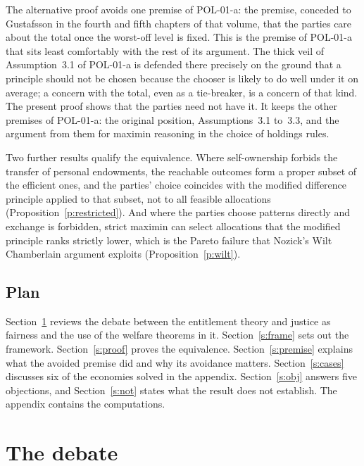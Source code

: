 \documentclass{situationist-preprint}
\begin{document}
The alternative proof avoids one premise of POL-01-a: the premise, conceded to Gustafsson in the fourth and fifth chapters of that volume, that the parties care about the total once the worst-off level is fixed. This is the premise of POL-01-a that sits least comfortably with the rest of its argument. The thick veil of Assumption~3.1 of POL-01-a is defended there precisely on the ground that a principle should not be chosen because the chooser is likely to do well under it on average; a concern with the total, even as a tie-breaker, is a concern of that kind. The present proof shows that the parties need not have it. It keeps the other premises of POL-01-a: the original position, Assumptions~3.1 to~3.3, and the argument from them for maximin reasoning in the choice of holdings rules.

Two further results qualify the equivalence. Where self-ownership forbids the transfer of personal endowments, the reachable outcomes form a proper subset of the efficient ones, and the parties' choice coincides with the modified difference principle applied to that subset, not to all feasible allocations (Proposition~\ref{p:restricted}). And where the parties choose patterns directly and exchange is forbidden, strict maximin can select allocations that the modified principle ranks strictly lower, which is the Pareto failure that Nozick's Wilt Chamberlain argument exploits (Proposition~\ref{p:wilt}).

\subsection{Plan}

Section~\ref{s:lit} reviews the debate between the entitlement theory and justice as fairness and the use of the welfare theorems in it. Section~\ref{s:frame} sets out the framework. Section~\ref{s:proof} proves the equivalence. Section~\ref{s:premise} explains what the avoided premise did and why its avoidance matters. Section~\ref{s:cases} discusses six of the economies solved in the appendix. Section~\ref{s:obj} answers five objections, and Section~\ref{s:not} states what the result does not establish. The appendix contains the computations.

\section{The debate}\label{s:lit}
\end{document}
